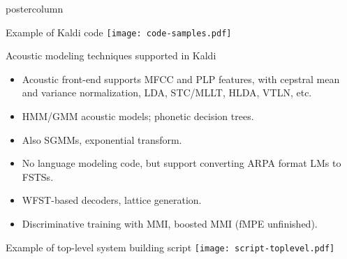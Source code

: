 \documentclass[final,hyperref={pdfpagelabels=false}]{beamer}
\newlength{\columnheight}
\begin{document}
\begin{frame}[fragile]
\begin{columns}
    \begin{column}{.33\textwidth}
      \begin{beamercolorbox}[center,wd=\textwidth]{postercolumn}
        \begin{minipage}[T]{.95\textwidth} %
          \parbox[t][\columnheight]{\textwidth}{ %
            

            \begin{block}{Example of Kaldi code}
                  \texttt{[image: code-samples.pdf]} 
            \end{block}
            \vfill
            \begin{block}{Acoustic modeling techniques supported in Kaldi}
              \begin{itemize}
              \item Acoustic front-end supports MFCC and PLP features, with 
                cepstral mean and variance normalization, LDA, STC/MLLT, HLDA,
                VTLN, etc.
              \item HMM/GMM acoustic models; phonetic decision trees.
              \item Also SGMMs, exponential transform.
              \item No language modeling code, but support converting ARPA 
                format LMs to FSTSs.
              \item WFST-based decoders, lattice generation.
              \item Discriminative training with MMI, boosted MMI (fMPE unfinished).
              \end{itemize}
            \end{block}
            \vfill
            \begin{block}{Example of top-level system building script}
                  \texttt{[image: script-toplevel.pdf]} 
            \end{block}
          }
        \end{minipage}
      \end{beamercolorbox}
    \end{column}


\end{columns}
\end{frame}
\end{document}
